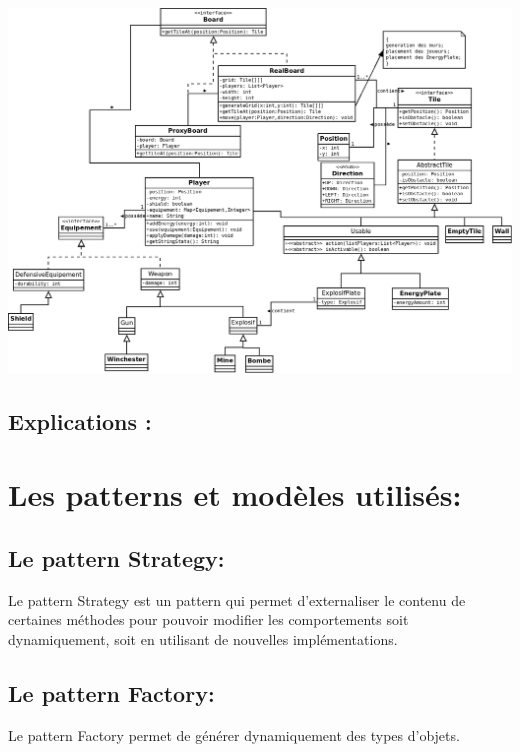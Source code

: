 \documentclass{article}
\begin{document}
\vspace{3\baselineskip}


\includegraphics[scale=0.25]{DiagrammeUML.png}


\vspace{1\baselineskip}

\subsection{Explications :}

\vspace{1\baselineskip}

\section{Les patterns et modèles utilisés:}

\subsection{Le pattern Strategy:}


Le pattern Strategy est un pattern qui permet d'externaliser le contenu de certaines méthodes pour pouvoir modifier les comportements soit dynamiquement, soit en utilisant de nouvelles implémentations.


\subsection{Le pattern Factory:}

Le pattern Factory permet de générer dynamiquement des types d'objets.
\end{document}
